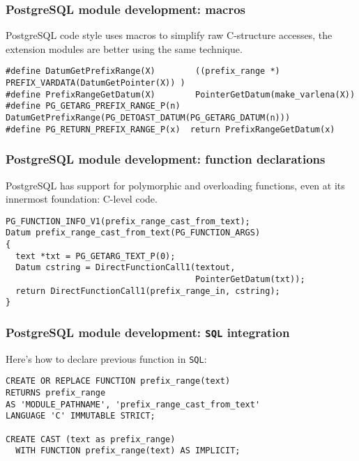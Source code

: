 \documentclass{beamer}
\begin{document}
\begin{frame}[fragile]
  \frametitle{PostgreSQL module development: macros}

  PostgreSQL code style uses macros to simplify raw C-structure accesses,
  the extension modules are better using the same technique.

  \begin{example}
  \begin{verbatim}
#define DatumGetPrefixRange(X)	      ((prefix_range *) PREFIX_VARDATA(DatumGetPointer(X)) )
#define PrefixRangeGetDatum(X)	      PointerGetDatum(make_varlena(X))
#define PG_GETARG_PREFIX_RANGE_P(n)  DatumGetPrefixRange(PG_DETOAST_DATUM(PG_GETARG_DATUM(n)))
#define PG_RETURN_PREFIX_RANGE_P(x)  return PrefixRangeGetDatum(x)
  \end{verbatim}
  \end{example}
\end{frame}


\begin{frame}[fragile]
  \frametitle{PostgreSQL module development: function declarations}

  PostgreSQL has support for polymorphic and overloading functions, even at
  its innermost foundation: C-level code.

  \begin{example}
  \begin{verbatim}
PG_FUNCTION_INFO_V1(prefix_range_cast_from_text);
Datum prefix_range_cast_from_text(PG_FUNCTION_ARGS)
{
  text *txt = PG_GETARG_TEXT_P(0);
  Datum cstring = DirectFunctionCall1(textout, 
                                      PointerGetDatum(txt));
  return DirectFunctionCall1(prefix_range_in, cstring);
}
  \end{verbatim}
  \end{example}
\end{frame}

\begin{frame}[fragile]
  \frametitle{PostgreSQL module development: \texttt{SQL} integration}

  Here's how to declare previous function in \texttt{SQL}:

  \begin{example}
  \begin{verbatim}
CREATE OR REPLACE FUNCTION prefix_range(text)
RETURNS prefix_range
AS 'MODULE_PATHNAME', 'prefix_range_cast_from_text'
LANGUAGE 'C' IMMUTABLE STRICT;

CREATE CAST (text as prefix_range)
  WITH FUNCTION prefix_range(text) AS IMPLICIT;
  \end{verbatim}
  \end{example}
\end{frame}
\end{document}
